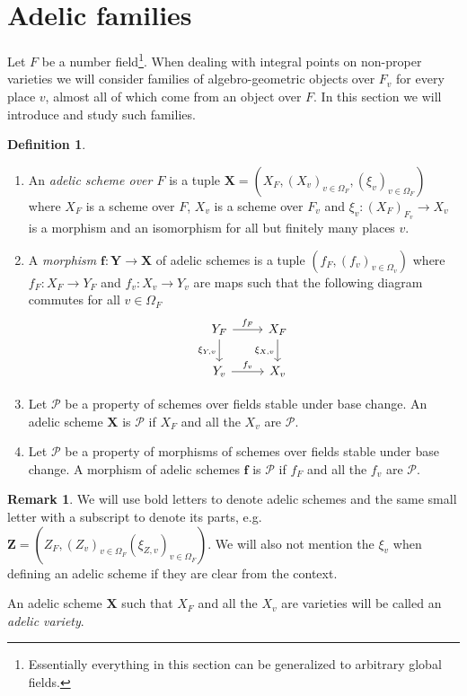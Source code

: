 \documentclass[a4paper,11pt,reqno]{amsart}
\theoremstyle{definition}
\newtheorem{definition}[theorem]{Definition}
\newtheorem{remark}[theorem]{Remark}
\begin{document}
\section{Adelic families}
Let $F$ be a number field\footnote{Essentially everything in this section can be generalized to arbitrary global fields.}. When dealing with integral points on non-proper varieties we will consider families of algebro-geometric objects over $F_v$ for every place $v$, almost all of which come from an object over $F$. In this section we will introduce and study such families.
\begin{definition} \hfill
	\begin{enumerate}
		\item An \emph{adelic scheme over $F$} is a tuple $\mathbf{X} = (X_F, (X_v)_{v \in \Omega_F}, (\xi_{v})_{v \in \Omega_F})$ where $X_F$ is a scheme over $F$, $X_v$ is a scheme over $F_v$ and $\xi_{v}: (X_F)_{F_v} \to X_v$ is a morphism and an isomorphism for all but finitely many places $v$. 
		\item A \emph{morphism} $\mathbf{f}: \mathbf{Y} \to \mathbf{X}$ of adelic schemes is a tuple $(f_F, (f_v)_{v \in \Omega_v})$ where $f_F: X_F \to Y_F$ and $f_v: X_v \to Y_v$ are maps such that the following diagram commutes for all $v \in \Omega_F$
		\begin{equation*}
			\begin{tikzcd}
				Y_F & X_F \\
				Y_v & X_v
				\arrow["f_F", from=1-1, to=1-2]
				\arrow["\xi_{Y, v}"', from=1-1, to=2-1]
				\arrow["f_v", from=2-1, to=2-2]
				\arrow["\xi_{X, v}"', from=1-2, to=2-2]
			\end{tikzcd}
		\end{equation*}
		\item Let $\mathcal{P}$ be a property of schemes over fields stable under base change. An adelic scheme $\mathbf{X}$ is $\mathcal{P}$ if $X_F$ and all the $X_v$ are $\mathcal{P}$. 
		\item Let $\mathcal{P}$ be a property of morphisms of schemes over fields stable under base change. A morphism of adelic schemes $\mathbf{f}$ is $\mathcal{P}$ if $f_F$ and all the $f_v$ are $\mathcal{P}$. 
	\end{enumerate}
\end{definition}
\begin{remark} 
	We will use bold letters to denote adelic schemes and the same small letter with a subscript to denote its parts, e.g.~$\mathbf{Z} = (Z_F, (Z_v)_{v \in \Omega_F} (\xi_{Z, v})_{v \in \Omega_F})$. We will also not mention the $\xi_v$ when defining an adelic scheme if they are clear from the context.
	
	An adelic scheme $\mathbf{X}$ such that $X_F$ and all the $X_v$ are varieties will be called an \emph{adelic variety}.
\end{remark}
\end{document}
